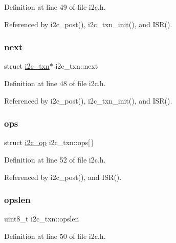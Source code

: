 Definition at line 49 of file i2c.\+h.



Referenced by i2c\+\_\+post(), i2c\+\_\+txn\+\_\+init(), and I\+S\+R().

\mbox{\label{structi2c__txn_a11186c957c400dc51479a883575d4b0d}} 
\subsubsection{\texorpdfstring{next}{next}}
{\footnotesize\ttfamily struct \hyperlink{structi2c__txn}{i2c\+\_\+txn}$\ast$ i2c\+\_\+txn\+::next}



Definition at line 48 of file i2c.\+h.



Referenced by i2c\+\_\+post(), i2c\+\_\+txn\+\_\+init(), and I\+S\+R().

\mbox{\label{structi2c__txn_a49e5dbfb39ee1df7021f37ec67c8d2e0}} 
\subsubsection{\texorpdfstring{ops}{ops}}
{\footnotesize\ttfamily struct \hyperlink{structi2c__op}{i2c\+\_\+op} i2c\+\_\+txn\+::ops\mbox{[}$\,$\mbox{]}}



Definition at line 52 of file i2c.\+h.



Referenced by i2c\+\_\+post(), and I\+S\+R().

\mbox{\label{structi2c__txn_ad936e904a9dcf5cb352e1b8a1dac60bc}} 
\subsubsection{\texorpdfstring{opslen}{opslen}}
{\footnotesize\ttfamily uint8\+\_\+t i2c\+\_\+txn\+::opslen}



Definition at line 50 of file i2c.\+h.




